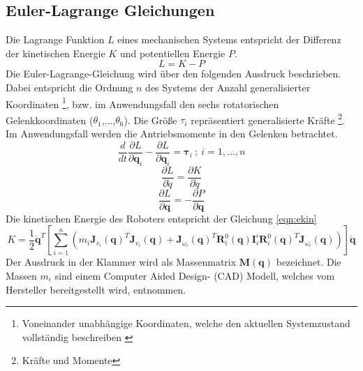 \subsection{Euler-Lagrange Gleichungen}
Die Lagrange Funktion $L$ eines mechanischen Systems entspricht der Differenz der kinetischen Energie $K$ und potentiellen Energie $P$.~\autocite[S.~175]{Spong.2020}
\begin{equation}
	L = K-P 
\end{equation}
%
%
%
Die Euler-Lagrange-Gleichung wird über den folgenden Ausdruck beschrieben. Dabei entspricht die Ordnung $n$ des Systems der Anzahl generalisierter Koordinaten \footnote{Voneinander unabhängige Koordinaten, welche den aktuellen Systemzustand vollständig beschreiben \cite{Engelke.2008}}, bzw. im Anwendungsfall den sechs rotatorischen Gelenkkoordinaten ($\theta_1$,...,$\theta_6$). Die Größe $\tau_i$ repräsentiert generalisierte Kräfte \footnote{Kräfte und Momente}. Im Anwendungsfall werden die Antriebsmomente in den Gelenken betrachtet. 
%
\begin{equation}
	\frac{d}{dt} \frac{\partial{L}}{\partial{\dot{\bm{q}_i}}}- \frac{\partial{L}}{\partial{\bm{q}_i}} = \bm{\tau}_i \ ;  \ i = 1,...,n 
\end{equation}
%
\begin{equation}
	\frac{\partial{L}}{\partial{\dot{q}}} = \frac{\partial{K}}{\partial{\dot{q}}}
\end{equation}
%
\begin{equation}
	\frac{\partial{L}}{\partial{\bm{q}}} = -\frac{\partial{P}}{\partial{\bm{q}}}
\end{equation}
%
Die kinetischen Energie des Roboters entspricht der Gleichung  \ref{eqn:ekin}
\begin{equation}
	\label{eqn:ekin}
	K = \frac{1}{2} \dot{\bm{\bm{q}}}^T \left[\sum_{i=1}^{n} \left( m_i \bm{J}_{v_i}(\bm{q})^T \bm{J}_{v_i}(\bm{q}) + \bm{J}_{\omega_i}(\bm{q})^T \bm{R}^0_i(\bm{q}) \bm{I}^{i}_{i} \bm{R}^0_i(\bm{q})^T \bm{J}_{\omega_i}(\bm{q}) \right) \right]\dot{\bm{\bm{q}}}
\end{equation}
%
Der Ausdruck in der Klammer wird als Massenmatrix $\bm{M}(\bm{q})$ bezeichnet. 
Die Massen $m_i$ sind einem Computer Aided Design- (CAD) Modell, welches vom Hersteller bereitgestellt wird, entnommen. 
